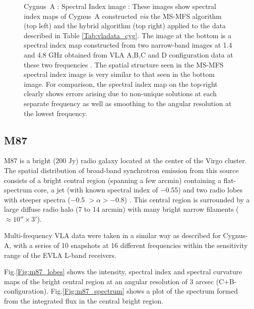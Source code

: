 \documentclass[structabstract]{stylefiles/aa}
\renewcommand{\cite}{\citep}
\begin{document}
\begin{figure}[t!]
\begin{center}
\end{center}
\begin{center}
\end{center}
\caption[Cygnus~A : Spectral Index image]
{\small Cygnus~A : Spectral Index image : 
These images show spectral index maps of Cygnus~A constructed {\it via}
the MS-MFS algorithm (top left) and the hybrid algorithm (top right)
applied to the data described in Table \ref{Tab:vladata_cyg}.
The image at the bottom is a spectral index map constructed from 
two narrow-band images at 1.4 and 4.8 GHz obtained
from VLA A,B,C and D configuration data at these two frequencies \cite{CYGA_1991}. 
The spatial structure seen in the MS-MFS spectral index image is very similar
to that seen in the bottom image. For comparison, the spectral index
map on the top-right clearly shows errors arising due to non-unique 
solutions at each separate frequency as well as smoothing to the
angular resolution at the lowest frequency.
}
\label{Fig:cyga_spx}
\end{figure}

\subsection{M87}

M87 is a bright (200 Jy) radio galaxy located at the center of the Virgo cluster.
The spatial distribution of broad-band synchrotron emission from this source 
consists of a bright central region (spanning a few arcmin) containing a 
flat-spectrum core, a jet (with known spectral index of $-$0.55) and two radio lobes
with steeper spectra ($-$0.5 $> \alpha > -$0.8) 
\citep{Rottmann_1996_AA,Owen_2000}.
This central region is 
surrounded by a large diffuse radio
halo (7 to 14 arcmin) with many bright narrow filaments ($\approx 10''\times 3'$).

Multi-frequency VLA data were taken in a similar way as described for
Cygnus-A, with a series of 10 snapshots at 16 different frequencies 
within the sensitivity range of the EVLA L-band receivers. 

Fig.\ref{Fig:m87_lobes} shows the intensity, spectral
index and spectral curvature maps of the bright central region at an
angular resolution of 3 arcsec (C+B-configuration).
Fig.\ref{Fig:m87_spectrum} shows a plot of the spectrum formed from the 
integrated flux in the central bright region.
\end{document}
